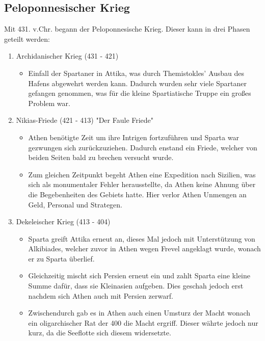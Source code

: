 \documentclass{article}
\begin{document}
	\subsection{Peloponnesischer Krieg}
	Mit 431. v.Chr. begann der Peloponnesische Krieg. Dieser kann in drei Phasen geteilt werden:
	\begin{enumerate}
		\item{Archidanischer Krieg (431 - 421)}
		\begin{itemize}
			\item{Einfall der Spartaner in Attika, was durch Themistokles' Ausbau des Hafens abgewehrt werden kann. Dadurch wurden sehr viele Spartaner gefangen genommen, was für die kleine Spartiatische Truppe ein großes Problem war.}
		\end{itemize}
		\item{Nikias-Friede (421 - 413) "Der Faule Friede"}
		\begin{itemize}
			\item{Athen benötigte Zeit um ihre Intrigen fortzuführen und Sparta war gezwungen sich zurückzuziehen. Dadurch enstand ein Friede, welcher von beiden Seiten bald zu brechen versucht wurde.}
			\item{Zum gleichen Zeitpunkt begeht Athen eine Expedition nach Sizilien, was sich als monumentaler Fehler herausstellte, da Athen keine Ahnung über die Begebenheiten des Gebiets hatte. Hier verlor Athen Unmengen an Geld, Personal und Strategen.}
		\end{itemize}
		\item{Dekeleischer Krieg (413 - 404)}
		\begin{itemize}
			\item{Sparta greift Attika erneut an, dieses Mal jedoch mit Unterstützung von Alkibiades, welcher zuvor in Athen wegen Frevel angeklagt wurde, wonach er zu Sparta überlief.}
			\item{Gleichzeitig mischt sich Persien erneut ein und zahlt Sparta eine kleine Summe dafür, dass sie Kleinasien aufgeben. Dies geschah jedoch erst nachdem sich Athen auch mit Persien zerwarf. }
			\item{Zwischendurch gab es in Athen auch einen Umsturz der Macht wonach ein oligarchischer Rat der 400 die Macht ergriff. Dieser währte jedoch nur kurz, da die Seeflotte sich diesem widersetzte.}
		\end{itemize}
	\end{enumerate}
\end{document}

